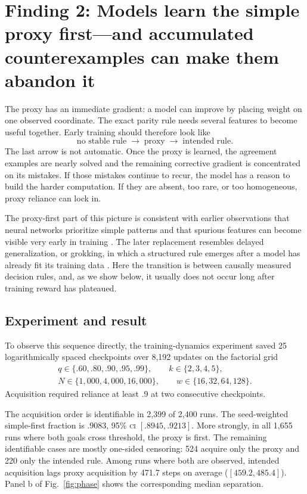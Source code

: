 \documentclass[11pt,a4paper]{article}
\newcommand{\CI}{\textsc{ci}}
\newcommand{\fig}[1]{Fig.~\ref{#1}}
\begin{document}
\section*{Finding 2: Models learn the simple proxy first---and accumulated counterexamples can make them abandon it}

The proxy has an immediate gradient: a model can improve by placing weight on one observed coordinate. The exact parity rule needs several features to become useful together. Early training should therefore look like
\[
\text{no stable rule}\;\longrightarrow\;\text{proxy}\;\longrightarrow\;\text{intended rule}.
\]
The last arrow is not automatic. Once the proxy is learned, the agreement examples are nearly solved and the remaining corrective gradient is concentrated on its mistakes. If those mistakes continue to recur, the model has a reason to build the harder computation. If they are absent, too rare, or too homogeneous, proxy reliance can lock in.

The proxy-first part of this picture is consistent with earlier observations that neural networks prioritize simple patterns and that spurious features can become visible very early in training \citep{arpit2017memorization,yang2024spurious}. The later replacement resembles delayed generalization, or grokking, in which a structured rule emerges after a model has already fit its training data \citep{power2022grokking,nanda2023progress}. Here the transition is between causally measured decision rules, and, as we show below, it usually does not occur long after training reward has plateaued.

\subsection*{Experiment and result}

To observe this sequence directly, the training-dynamics experiment saved 25 logarithmically spaced checkpoints over 8,192 updates on the factorial grid
\[
\begin{gathered}
q\in\{.60,.80,.90,.95,.99\},\qquad k\in\{2,3,4,5\},\\
N\in\{1{,}000,4{,}000,16{,}000\},\qquad w\in\{16,32,64,128\}.
\end{gathered}
\]
Acquisition required reliance at least .9 at two consecutive checkpoints.

The acquisition order is identifiable in 2,399 of 2,400 runs. The seed-weighted simple-first fraction is .9083, 95\% \CI{} $[.8945,.9213]$. More strongly, in all 1,655 runs where both goals cross threshold, the proxy is first. The remaining identifiable cases are mostly one-sided censoring: 524 acquire only the proxy and 220 only the intended rule. Among runs where both are observed, intended acquisition lags proxy acquisition by 471.7 steps on average ($[459.2,485.4]$). Panel b of \fig{fig:phase} shows the corresponding median separation.
\end{document}
